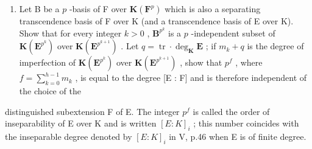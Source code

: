\begin{enumerate}
\def\labelenumi{\alph{enumi})}
\tightlist
\item
  Let B be a \(p\) -basis of F over \(\mathbf{K}(\mathbf{F}^p)\) which is also a separating transcendence basis of F over K (and a transcendence basis of E over K). Show that for every integer \(k > 0\) , \(\mathbf{B}^{p^k}\) is a \(p\) -independent subset of \(\mathbf{K}(\mathbf{E}^{p^k})\) over \(\mathbf{K}(\mathbf{E}^{p^{k+1}})\) . Let \(q = \operatorname{tr} \cdot \deg_{\mathbf{K}} \mathbf{E}\) ; if \(m_k + q\) is the degree of imperfection of \(\mathbf{K}(\mathbf{E}^{p^k})\) over \(\mathbf{K}(\mathbf{E}^{p^{k+1}})\) , show that \(p^f\) , where \(f = \sum_{k=0}^{h-1} m_k\) , is equal to the degree {[}E : F{]} and is therefore independent of the choice of the
\end{enumerate}

distinguished subextension F of E. The integer \(p^{f}\) is called the order of inseparability of E over K and is written \([E:K]_{i}\) ; this number coincides with the inseparable degree denoted by \([E:K]_{i}\) in V, p.46 when E is of finite degree.

